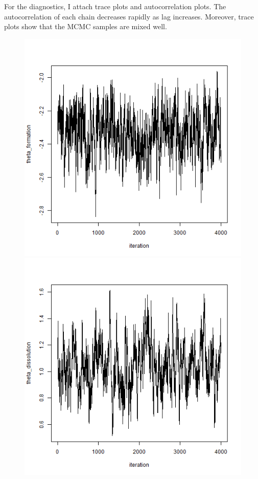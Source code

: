 \documentclass[a4paper, 11pt]{report}
\theoremstyle{definition}
\begin{document}
For the diagnostics, I attach trace plots and autocorrelation plots.
The autocorrelation of each chain decreases rapidly as lag increases.
Moreover, trace plots show that the MCMC samples are mixed well.

\begin{figure}[h]
    \begin{center}
        \includegraphics[scale=0.395]{pictures/net1seq_chain1_BSTERGM_formation_traceplot.png}
        \includegraphics[scale=0.395]{pictures/net1seq_chain1_BSTERGM_dissolution_traceplot.png} \\

\end{center}
\end{figure}
\end{document}
